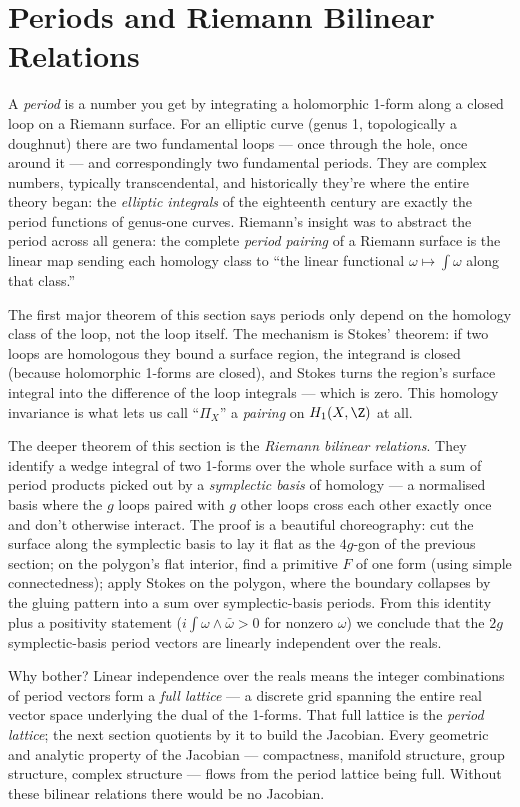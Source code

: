 \section{Periods and Riemann Bilinear Relations}
\label{sec:periods}

\begin{layman}
A \emph{period} is a number you get by integrating a holomorphic
1-form along a closed loop on a Riemann surface. For an elliptic
curve (genus 1, topologically a doughnut) there are two
fundamental loops --- once through the hole, once around it --- and
correspondingly two fundamental periods. They are complex numbers,
typically transcendental, and historically they're where the entire
theory began: the \emph{elliptic integrals} of the eighteenth
century are exactly the period functions of genus-one curves.
Riemann's insight was to abstract the period across all genera:
the complete \emph{period pairing} of a Riemann surface is the
linear map sending each homology class to ``the linear functional
\(\omega \mapsto \int \omega\) along that class.''

The first major theorem of this section says periods only depend on
the homology class of the loop, not the loop itself. The mechanism
is Stokes' theorem: if two loops are homologous they bound a
surface region, the integrand is closed (because holomorphic
1-forms are closed), and Stokes turns the region's surface integral
into the difference of the loop integrals --- which is zero. This
homology invariance is what lets us call ``\(\Pi_X\)'' a
\emph{pairing} on \(H_1(X,\Z)\) at all.

The deeper theorem of this section is the \emph{Riemann bilinear
relations}. They identify a wedge integral of two 1-forms over the
whole surface with a sum of period products picked out by a
\emph{symplectic basis} of homology --- a normalised basis where the
\(g\) loops paired with \(g\) other loops cross each other exactly
once and don't otherwise interact. The proof is a beautiful
choreography: cut the surface along the symplectic basis to lay it
flat as the \(4g\)-gon of the previous section; on the polygon's
flat interior, find a primitive \(F\) of one form (using simple
connectedness); apply Stokes on the polygon, where the boundary
collapses by the gluing pattern into a sum over symplectic-basis
periods. From this identity plus a positivity statement
(\(i\int \omega \wedge \bar\omega > 0\) for nonzero \(\omega\)) we
conclude that the \(2g\) symplectic-basis period vectors are
linearly independent over the reals.

Why bother? Linear independence over the reals means the integer
combinations of period vectors form a \emph{full lattice} --- a
discrete grid spanning the entire real vector space underlying the
dual of the 1-forms. That full lattice is the \emph{period lattice};
the next section quotients by it to build the Jacobian. Every
geometric and analytic property of the Jacobian --- compactness,
manifold structure, group structure, complex structure --- flows
from the period lattice being full. Without these bilinear
relations there would be no Jacobian.
\end{layman}


